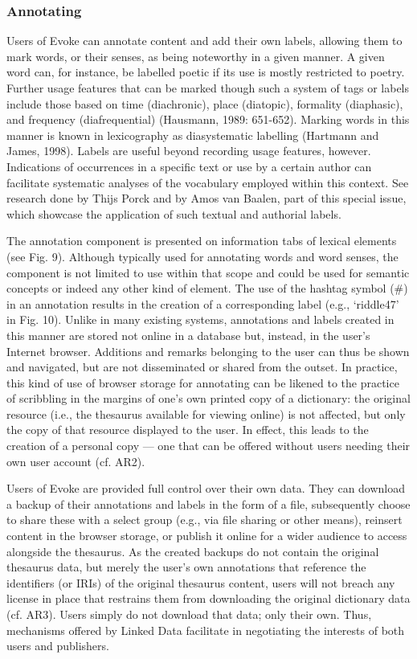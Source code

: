 \subsubsection{Annotating}
Users of Evoke can annotate content and add their own labels, allowing them to mark words, or their senses, as being noteworthy in a given manner. A given word can, for instance, be labelled poetic if its use is mostly restricted to poetry. Further usage features that can be marked though such a system of tags or labels include those based on time (diachronic), place (diatopic), formality (diaphasic), and frequency (diafrequential) (Hausmann, 1989: 651-652). Marking words in this manner is known in lexicography as diasystematic labelling (Hartmann and James, 1998). Labels are useful beyond recording usage features, however. Indications of occurrences in a specific text or use by a certain author can facilitate systematic analyses of the vocabulary employed within this context. See research done by Thijs Porck and by Amos van Baalen, part of this special issue, which showcase the application of such textual and authorial labels.

The annotation component is presented on information tabs of lexical elements (see Fig. 9). Although typically used for annotating words and word senses, the component is not limited to use within that scope and could be used for semantic concepts or indeed any other kind of element. The use of the hashtag symbol (\#) in an annotation results in the creation of a corresponding label (e.g., ‘riddle47’ in Fig. 10). Unlike in many existing systems, annotations and labels created in this manner are stored not online in a database but, instead, in the user’s Internet browser.  Additions and remarks belonging to the user can thus be shown and navigated, but are not disseminated or shared from the outset. In practice, this kind of use of browser storage for annotating can be likened to the practice of scribbling in the margins of one’s own printed copy of a dictionary: the original resource (i.e., the thesaurus available for viewing online) is not affected, but only the copy of that resource displayed to the user. In effect, this leads to the creation of a personal copy — one that can be offered without users needing their own user account (cf. AR2).

Users of Evoke are provided full control over their own data. They can download a backup of their annotations and labels in the form of a file, subsequently choose to share these with a select group (e.g., via file sharing or other means), reinsert content in the browser storage, or publish it online for a wider audience to access alongside the thesaurus. As the created backups do not contain the original thesaurus data, but merely the user’s own annotations that reference the identifiers (or IRIs) of the original thesaurus content, users will not breach any license in place that restrains them from downloading the original dictionary data (cf. AR3). Users simply do not download that data; only their own. Thus, mechanisms offered by Linked Data facilitate in negotiating the interests of both users and publishers.

